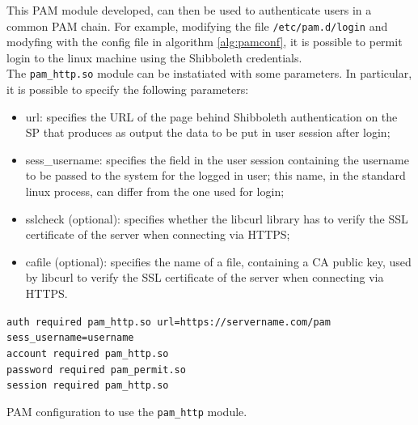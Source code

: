 This PAM module developed, can then be used to authenticate users in a common PAM chain.
For example, modifying the file \texttt{/etc/pam.d/login} and modyfing with the config file in algorithm \ref{alg:pamconf}, it is
possible to permit login to the linux machine using the Shibboleth credentials.\\
The \texttt{pam\_http.so} module can be instatiated with some parameters.
In particular, it is possible to specify the following parameters:
\begin{itemize}
\item url: specifies the URL of the page behind Shibboleth authentication on the SP that produces as output the data to be put in user
session after login;
\item sess\_username: specifies the field in the user session containing the username to be passed to the system for the logged in user;
this name, in the standard linux process, can differ from the one used for login;
\item sslcheck (optional): specifies whether the libcurl library has to verify the SSL certificate of the server when connecting via HTTPS;
\item cafile (optional): specifies the name of a file, containing a CA public key, used by libcurl to verify the SSL certificate of the server
when connecting via HTTPS.
\end{itemize}

\begin{algorithm}[t]
\SetAlgoNoLine
\texttt{auth     required       pam\_http.so url=https://servername.com/pam sess\_username=username}\\
\texttt{account  required       pam\_http.so}\\
\texttt{password required       pam\_permit.so}\\
\texttt{session  required       pam\_http.so}
\caption{PAM configuration to use the \texttt{pam\_http} module.}
\label{alg:pamconf}
\end{algorithm}

\label{sec:nss}
